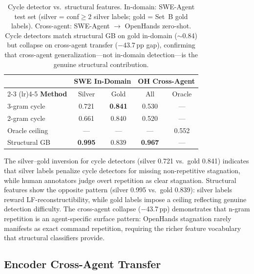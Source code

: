 \begin{table}[h]
\centering
\small
\begin{tabular}{lcccc}
\toprule
& \multicolumn{2}{c}{\textbf{SWE In-Domain}} & \multicolumn{2}{c}{\textbf{OH Cross-Agent}} \\
\cmidrule(lr){2-3} \cmidrule(lr){4-5}
\textbf{Method} & Silver & Gold & All & Oracle \\
\midrule
3-gram cycle & 0.721 & \textbf{0.841} & 0.530 & --- \\
2-gram cycle & 0.661 & 0.840 & 0.520 & --- \\
Oracle ceiling & --- & --- & --- & 0.552 \\
\midrule
Structural GB & \textbf{0.995} & 0.839 & \textbf{0.967} & --- \\
\bottomrule
\end{tabular}
\caption{Cycle detector vs.\ structural features. In-domain: SWE-Agent test set (silver = conf${\geq}$2 silver labels; gold = Set~B gold labels). Cross-agent: SWE-Agent $\to$ OpenHands zero-shot. Cycle detectors match structural GB on gold in-domain (${\sim}$0.84) but collapse on cross-agent transfer ($-$43.7\,pp gap), confirming that cross-agent generalization---not in-domain detection---is the genuine structural contribution.}
\label{tab:cycle_detector}
\end{table}

The silver--gold inversion for cycle detectors (silver 0.721 vs.\ gold 0.841) indicates that silver labels penalize cycle detectors for missing non-repetitive stagnation, while human annotators judge overt repetition as clear stagnation.
Structural features show the opposite pattern (silver 0.995 vs.\ gold 0.839): silver labels reward LF-reconstructibility, while gold labels impose a ceiling reflecting genuine detection difficulty.
The cross-agent collapse ($-$43.7\,pp) demonstrates that n-gram repetition is an agent-specific surface pattern: OpenHands stagnation rarely manifests as exact command repetition, requiring the richer feature vocabulary that structural classifiers provide.

\subsection{Encoder Cross-Agent Transfer}
\label{sec:app_encoder_cross}

